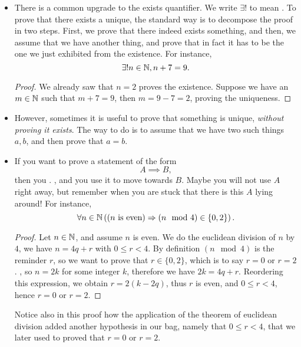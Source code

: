 \begin{itemize}
    \item There is a common upgrade to the exists quantifier. We write \( \exists! \) to mean . To prove that there exists a unique, the standard way is to decompose the proof in two steps. First, we prove that there indeed exists something, and then, we assume that we have another thing, and prove that in fact it has to be the one we just exhibited from the existence. For instance,
    \begin{equation*}
        \exists! n \in \mathbb{N}, n + 7 = 9.
    \end{equation*}
    \begin{proof}
        We already saw that \( n = 2 \) proves the existence. Suppose we have an \( m \in \mathbb{N} \) such that \( m + 7 = 9 \), then \( m = 9 - 7 = 2 \), proving the uniqueness.
    \end{proof}

    \item However, sometimes it is useful to prove that something is unique, \textit{without proving it exists}. The way to do is to assume that we have two such things \( a, b \), and then prove that \( a = b \).
    
    \item If you want to prove a statement of the form
    \begin{equation*}
        A \implies B,
    \end{equation*}
    then you . , and you use it to move towards \( B \). Maybe you will not use \( A \) right away, but remember when you are stuck that there is this \( A \) lying around! For instance,
    \begin{equation*}
        \forall n \in \mathbb{N} \left((n \text{ is even}) \Rightarrow (n \mod 4) \in \{ 0, 2 \} \right).
    \end{equation*}
    \begin{proof}
        Let \( n \in \mathbb{N} \), and assume \( n \) is even. We do the euclidean division of \( n \) by \( 4 \), we have \( n = 4q + r \) with \( 0 \le r < 4 \). By definition \( (n \mod 4) \) is the reminder \( r \), so we want to prove that \( r \in \{ 0, 2 \} \), which is to say \( r = 0 \) or \( r = 2 \). , so \( n = 2k \) for some integer \( k \), therefore we have \( 2k = 4q + r \). Reordering this expression, we obtain \( r = 2(k-2q) \), thus \( r \) is even, and \( 0 \le r < 4 \), hence \( r = 0 \) or \( r = 2 \).
    \end{proof}
    Notice also in this proof how the application of the theorem of euclidean division added another hypothesis in our bag, namely that \( 0 \le r < 4 \), that we later used to proved that \( r = 0 \) or \( r = 2 \).


\end{itemize}
